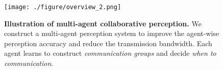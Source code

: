 \begin{figure}[t]
    \begin{center}
    \centerline{\texttt{[image: ./figure/overview\_2.png]}}
    \caption{
        \textbf{Illustration of multi-agent collaborative perception.} We construct a multi-agent perception system to improve the agent-wise perception accuracy and reduce the transmission bandwidth. Each agent learns to construct \textit{communication groups} and decide \textit{when to communication}.}
    \end{center}
    \vspace{-10mm}
\end{figure}
